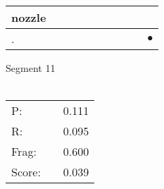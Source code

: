 \documentclass[landscape]{article}
\newcommand{\ssp}{\hspace{2pt}}
\newcommand{\mex}{\cellcolor{g}$\bullet$}
\begin{document}
\begin{tabular}{|l|p{10pt}|p{10pt}|p{10pt}|p{10pt}|p{10pt}|p{10pt}|p{10pt}|p{10pt}|p{10pt}|}
\hline
\ssp nozzle \ssp&\hspace{2pt}&\hspace{2pt}&\hspace{2pt}&\hspace{2pt}&\hspace{2pt}&\hspace{2pt}&\hspace{2pt}&\hspace{2pt}&\hspace{2pt}\\
\hline
\ssp \cellcolor{ref8}. \ssp&\hspace{2pt}&\hspace{2pt}&\hspace{2pt}&\hspace{2pt}&\hspace{2pt}&\hspace{2pt}&\hspace{2pt}&\hspace{2pt}&\hspace{2pt}\mex\\
\hline
\end{tabular}

\vspace{6pt}
\noindent Segment 11\\\\
\noindent\begin{tabular}{lm{12pt}r}
\hline
P:&&0.111\\
R:&&0.095\\
Frag:&&0.600\\
Score:&&0.039\\
\end{tabular}

\newpage
\end{document}
